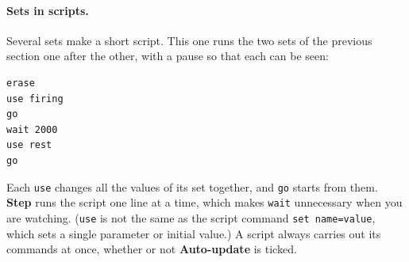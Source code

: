 \documentclass[11pt,a4paper]{article}
\newcommand{\ui}[1]{\textsf{\textbf{#1}}}          %
\begin{document}
\paragraph{Sets in scripts.} Several sets make a short script. This one runs the two sets of the previous section one after the other, with a pause so that each can be seen:
\begin{lstlisting}
erase
use firing
go
wait 2000
use rest
go
\end{lstlisting}
\noindent Each \texttt{use} changes all the values of its set together, and \texttt{go} starts from them. \ui{Step} runs the script one line at a time, which makes \texttt{wait} unnecessary when you are watching. (\texttt{use} is not the same as the script command \texttt{set name=value}, which sets a single parameter or initial value.) A script always carries out its commands at once, whether or not \ui{Auto-update} is ticked.
\end{document}
